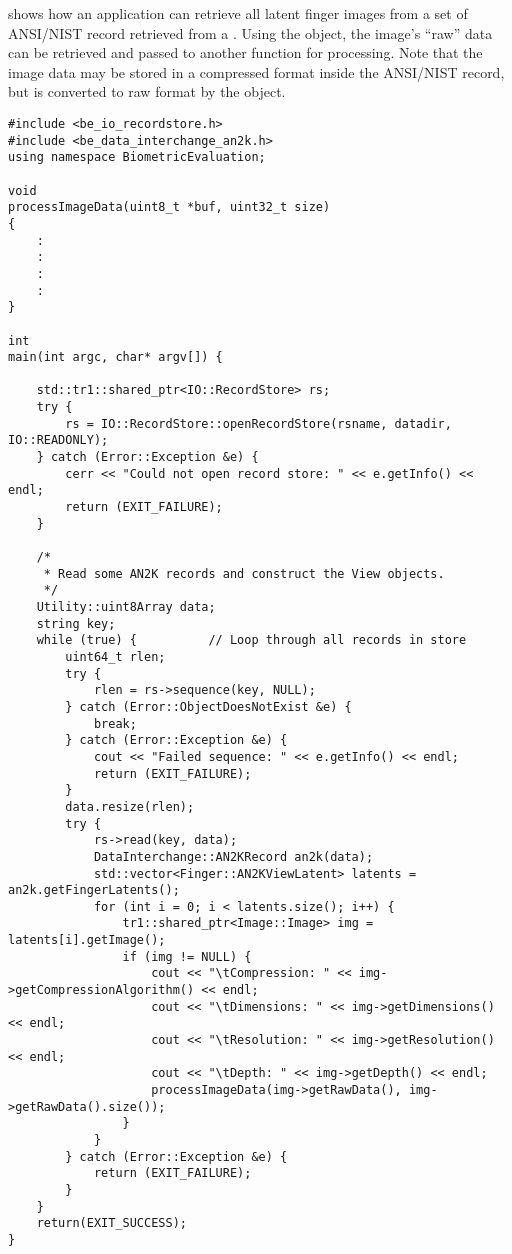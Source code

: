 shows how an application can retrieve all latent
finger images from a set of ANSI/NIST record retrieved from a .
Using the  object, the image's ``raw'' data can be retrieved and passed
to another function for processing. Note that the image data may be stored
in a compressed format inside the ANSI/NIST record, but is converted to raw
format by the  object.

\begin{lstlisting}[caption={Retrieving ANSI/NIST Latent Records}, label=lst:an2klatentuse]
#include <be_io_recordstore.h>
#include <be_data_interchange_an2k.h>
using namespace BiometricEvaluation;

void
processImageData(uint8_t *buf, uint32_t size)
{
    :
    :
    :
    :
}

int
main(int argc, char* argv[]) {

    std::tr1::shared_ptr<IO::RecordStore> rs;
    try {
        rs = IO::RecordStore::openRecordStore(rsname, datadir, IO::READONLY);
    } catch (Error::Exception &e) {
        cerr << "Could not open record store: " << e.getInfo() << endl;
        return (EXIT_FAILURE);
    }

    /*
     * Read some AN2K records and construct the View objects.
     */
    Utility::uint8Array data;
    string key;
    while (true) {          // Loop through all records in store
        uint64_t rlen;
        try {
            rlen = rs->sequence(key, NULL);
        } catch (Error::ObjectDoesNotExist &e) {
            break;
        } catch (Error::Exception &e) {
            cout << "Failed sequence: " << e.getInfo() << endl;
            return (EXIT_FAILURE);
        }
        data.resize(rlen);
        try {
            rs->read(key, data);
            DataInterchange::AN2KRecord an2k(data);
            std::vector<Finger::AN2KViewLatent> latents = an2k.getFingerLatents();
            for (int i = 0; i < latents.size(); i++) {
                tr1::shared_ptr<Image::Image> img = latents[i].getImage();
                if (img != NULL) {
                    cout << "\tCompression: " << img->getCompressionAlgorithm() << endl;
                    cout << "\tDimensions: " << img->getDimensions() << endl;
                    cout << "\tResolution: " << img->getResolution() << endl;
                    cout << "\tDepth: " << img->getDepth() << endl;
                    processImageData(img->getRawData(), img->getRawData().size());
                }
            }
        } catch (Error::Exception &e) {
            return (EXIT_FAILURE);
        }
    }
    return(EXIT_SUCCESS);
}
\end{lstlisting}

